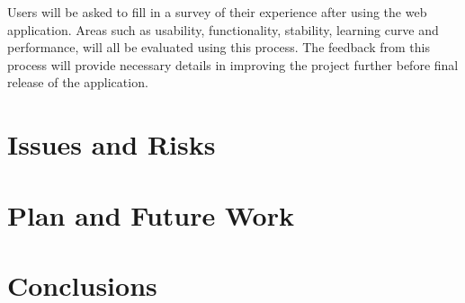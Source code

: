\documentclass[a4paper, 12pt]{article}
\begin{document}
Users will be asked to fill in a survey of their experience after using the web application. Areas such as usability, functionality, stability, learning curve and performance, will all be evaluated using this process. The feedback from this process will provide necessary details in improving the project further before final release of the application.

\section{Issues and Risks}
\section{Plan and Future Work}
\section{Conclusions}
\end{document}
